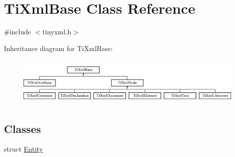 \hypertarget{classTiXmlBase}{
\section{\-Ti\-Xml\-Base \-Class \-Reference}
\label{d8/d47/classTiXmlBase}
}


{\ttfamily \#include $<$tinyxml.\-h$>$}

\-Inheritance diagram for \-Ti\-Xml\-Base\-:\begin{figure}[H]
\begin{center}
\leavevmode
\includegraphics[height=2.413793cm]{d8/d47/classTiXmlBase}
\end{center}
\end{figure}
\subsection*{\-Classes}
\begin{DoxyCompactItemize}
\item 
struct \hyperlink{structTiXmlBase_1_1Entity}{\-Entity}
\end{DoxyCompactItemize}
